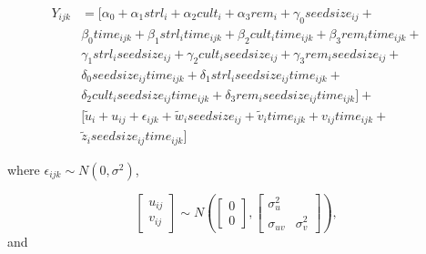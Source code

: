 \documentclass[
]{krantz}
\begin{document}
\begin{align*}
Y_{ijk} & = [\alpha_{0}+\alpha_{1}\textstyle{strl}_{i}+\alpha_{2}\textstyle{cult}_{i}+\alpha_{3}\textstyle{rem}_{i} +
 \gamma_{0}\textstyle{seedsize}_{ij} + \\
 & \beta_{0}\textstyle{time}_{ijk} + \beta_{1}\textstyle{strl}_{i}\textstyle{time}_{ijk}+\beta_{2}\textstyle{cult}_{i}\textstyle{time}_{ijk}+ \beta_{3}\textstyle{rem}_{i}\textstyle{time}_{ijk} + \\
 & \gamma_{1}\textstyle{strl}_{i}\textstyle{seedsize}_{ij}+\gamma_{2}\textstyle{cult}_{i}\textstyle{seedsize}_{ij}+ \gamma_{3}\textstyle{rem}_{i}\textstyle{seedsize}_{ij} + \\
 & \delta_{0}\textstyle{seedsize}_{ij}\textstyle{time}_{ijk} + \delta_{1}\textstyle{strl}_{i}\textstyle{seedsize}_{ij}\textstyle{time}_{ijk} + \\
 & \delta_{2}\textstyle{cult}_{i}\textstyle{seedsize}_{ij}\textstyle{time}_{ijk} + \delta_{3}\textstyle{rem}_{i}\textstyle{seedsize}_{ij}\textstyle{time}_{ijk}] + \\
 & [\tilde{u}_{i} + u_{ij} + \epsilon_{ijk} + \tilde{w}_{i}\textstyle{seedsize}_{ij} + \tilde{v}_{i}\textstyle{time}_{ijk} + v_{ij}\textstyle{time}_{ijk} + \\ 
 & \tilde{z}_{i}\textstyle{seedsize}_{ij}\textstyle{time}_{ijk} ]
\end{align*}

where \(\epsilon_{ijk}\sim N(0,\sigma^2)\),

\[ \left[ \begin{array}{c}
            u_{ij} \\ v_{ij}
          \end{array}  \right] \sim N \left( \left[
          \begin{array}{c}
            0 \\ 0
          \end{array} \right], \left[
          \begin{array}{cc}
            \sigma_{u}^{2} & \\
            \sigma_{uv} & \sigma_{v}^{2}
          \end{array} \right] \right), \] and
\end{document}
